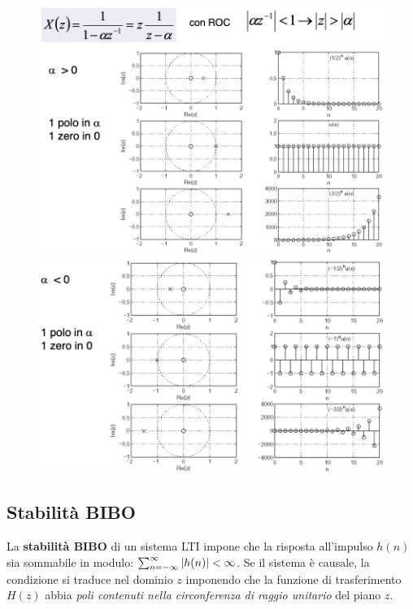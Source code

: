 \begin{figure}[p]
	\centering
	\includegraphics[scale=0.45]{Lezioni/Immagini/rocalpha1} \\
	\vspace{0.5cm}
	\hspace*{0.5cm} 
	\includegraphics[scale=0.43]{Lezioni/Immagini/rocalpha2}
\end{figure}

\newpage
\subsection{Stabilità BIBO}
La \textbf{stabilità BIBO} di un sistema LTI impone che la risposta all'impulso $h(n)$ sia sommabile in modulo: $\sum_{n=-\infty}^{\infty}\left|h(n)\right| < \infty$. Se il sistema è causale, la condizione si traduce nel dominio $z$ imponendo che la funzione di trasferimento $H(z)$ abbia \textit{poli contenuti nella circonferenza di raggio unitario} del piano $z$. 

